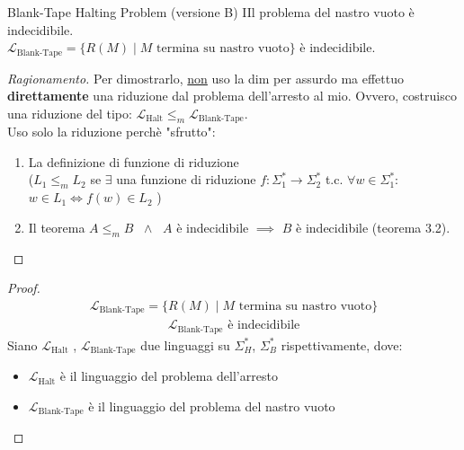 \documentclass{article}  %
\theoremstyle{definition}
\newenvironment{ragionamento}[1][]
  {\begin{proof}[Ragionamento#1]\renewcommand{\qedsymbol}{}\normalfont}
  {\end{proof}}
\begin{document}
\begin{theorem}{Blank-Tape Halting Problem (versione B)}
	IIl problema del nastro vuoto è indecidibile. \\
	$\mathcal{L}_{\text{Blank-Tape}} = \{R(M) \mid M \text{ termina su nastro vuoto}\}$ è indecidibile.
	\footnotesize %
	\begin{ragionamento}
		Per dimostrarlo, \underline{non} uso la dim per assurdo ma effettuo \textbf{direttamente} una riduzione dal problema dell'arresto al mio. Ovvero,
		costruisco una riduzione del tipo: $\mathcal{L}_{\text{Halt}} \leq_m \mathcal{L}_{\text{Blank-Tape}}$. \\
		Uso solo la riduzione perchè "sfrutto":
		\begin{enumerate}
			\item La definizione di funzione di riduzione\\
			      ($L_1 \leq_m L_2$ se $\exists$ una funzione di riduzione $f: \Sigma_1^* \rightarrow \Sigma_2^*$ t.c. $\forall{w}\in \Sigma_1^*$: \\
			      $w \in L_1 \iff f(w) \in L_2$
			      )
			\item Il teorema $A \leq_m B$ $\;\wedge\;$ $A$ è indecidibile $\implies$ $B$ è indecidibile (teorema 3.2).
		\end{enumerate}
	\end{ragionamento}
	\begin{proof}
		\begin{align*}
			\mathcal{L}_{\text{Blank-Tape}} = \{R(M) \mid M \text{ termina su nastro vuoto}\} \tag*{(ipotesi)}
		\end{align*}
		\begin{align*}
			\mathcal{L}_{\text{Blank-Tape}} \text{ è indecidibile} \tag*{(tesi)}
		\end{align*}
		Siano $\mathcal{L}_{\text{Halt}}$ , $\mathcal{L}_{\text{Blank-Tape}}$ due linguaggi su $\Sigma_H^*$, $\Sigma_B^*$ rispettivamente, dove:
		\begin{itemize}
			\item $\mathcal{L}_{\text{Halt}}$ è il linguaggio del problema dell'arresto
			\item $\mathcal{L}_{\text{Blank-Tape}}$ è il linguaggio del problema del nastro vuoto
		\end{itemize}


\end{proof}
\end{theorem}
\end{document}
